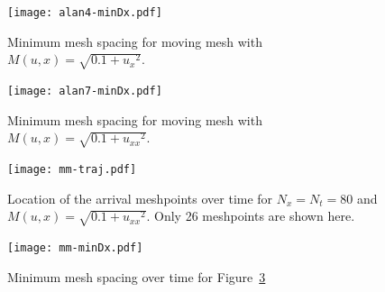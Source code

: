 \documentclass{article}
\begin{document}
\begin{figure}[hbtp]
\centering
  \texttt{[image: alan4-minDx.pdf]}
  \caption{Minimum mesh spacing for moving mesh with  $M(u,x) = \sqrt{0.1 + {u_{x}}^2}$.
  \label{fig:alan4-minDx}}
\end{figure}
\begin{figure}[hbtp]
\centering
  \texttt{[image: alan7-minDx.pdf]}
  \caption{Minimum mesh spacing for moving mesh with  $M(u,x) = \sqrt{0.1 + {u_{xx}}^2}$.
  \label{fig:alan7-minDx}}
\end{figure}
\begin{figure}[htbp]
\centering
  \texttt{[image: mm-traj.pdf]}
  \caption{Location of the arrival meshpoints over time for $N_x = N_t = 80$ and
  $M(u,x) = \sqrt{0.1 + {u_{xx}}^2}$. Only 26 meshpoints are shown here.
  \label{fig:mm-traj}}
\end{figure}
\begin{figure}[hbtp]
\centering
  \texttt{[image: mm-minDx.pdf]}
  \caption{Minimum mesh spacing over time for Figure~\ref{fig:mm-traj}
  \label{fig:mm-minDx}}
\end{figure}
\end{document}
